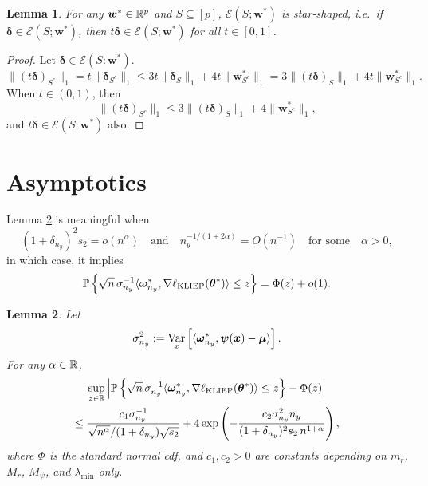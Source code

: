 \documentclass[11pt]{article}
\numberwithin{equation}{section}
\numberwithin{theorem}{section}
\def\fatw{\boldsymbol{w}}
\def\fatx{\boldsymbol{x}}
\def\fatdelta{\boldsymbol{\delta}}
\def\fatmu{\boldsymbol{\mu}}
\def\fattheta{\boldsymbol{\theta}}
\def\fatpsi{\boldsymbol{\psi}}
\def\fatomega{\boldsymbol{\omega}}
\newtheorem{lem}{Lemma}[section]
\theoremstyle{definition}
\theoremstyle{remark}
\begin{document}
\begin{lem} \label{lem:star_shaped}
For any $\fatw^* \in \RR^p$ and $S \subseteq [p]$, $\mathcal{E}(S;\fatw^*)$ is star-shaped, i.e.~if $\fatdelta \in \mathcal{E}(S;\fatw^*)$, then $t\fatdelta \in \mathcal{E}(S;\fatw^*)$ for all $t \in [0,1]$.
\end{lem}

\begin{proof}
Let $\fatdelta \in \mathcal{E}(S:\fatw^*)$.
\begin{equation}
\|(t\fatdelta)_{S^c}\|_1
= t \|\fatdelta_{S^c}\|_1
\leq 3t \|\fatdelta_S\|_1 + 4t \|\fatw_{S^c}^*\|_1
= 3 \|(t\fatdelta)_S\|_1 + 4t \|\fatw_{S^c}^*\|_1.
\end{equation}
When $t \in (0,1)$, then
\begin{equation}
\|(t\fatdelta)_{S^c}\|_1 \leq 3 \|(t\fatdelta)_S\|_1 + 4\|\fatw_{S^c}^*\|_1,
\end{equation}
and $t\fatdelta \in \mathcal{E}(S;\fatw^*)$ also.
\end{proof}

\section{Asymptotics} \label{app:asymp}

Lemma \ref{lem:Berry_Esseen_CLT} is meaningful when
\begin{equation}
(1+\delta_{n_y})^2 s_2 = o(n^\alpha)
\quad\text{and}\quad
n_y^{-1 / (1+2\alpha)} = O(n^{-1})
\quad\text{for some}\quad
\alpha > 0,
\end{equation}
in which case, it implies
\begin{equation}
\PP\left\{ \sqrt{n} \, \sigma_{n_y}^{-1} \langle \fatomega_{n_y}^*, \nabla \ell_\text{KLIEP}(\fattheta^*) \rangle \leq z \right\}
= \Phi(z) + o(1).
\end{equation}

\begin{lem} \label{lem:Berry_Esseen_CLT}
Let
\begin{equation}
\sigma_{n_y}^2
:= \Var_x \left[ \langle \fatomega_{n_y}^*, \fatpsi(\fatx) - \fatmu \rangle \right].
\end{equation}
For any $\alpha \in \mathbb{R}$,
\begin{multline}
\sup_{z \in \RR} \left| \PP\left\{ \sqrt{n} \, \sigma_{n_y}^{-1} \langle \fatomega_{n_y}^*, \nabla \ell_\text{KLIEP}(\fattheta^*) \rangle \leq z \right\} - \Phi(z) \right| \\
\leq \frac{c_1 \sigma_{n_y}^{-1}}{\sqrt{n^\alpha} / (1+\delta_{n_y}) \sqrt{s_2}} + 4 \exp\left( -\frac{c_2 \sigma_{n_y}^2 n_y}{(1+\delta_{n_y})^2 s_2 \, n^{1+\alpha}} \right),
\end{multline}
where $\Phi$ is the standard normal cdf, and $c_1, c_2 > 0$ are constants depending on $m_r$, $M_r$, $M_\psi$, and $\lambda_{\min}$ only.
\end{lem}
\end{document}
